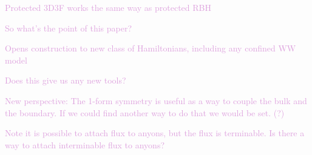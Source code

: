 \documentclass[twocolumn, longbibliography]{revtex4-2}
\newcommand{\outline}[1]{\textcolor{Plum}{#1}}
\begin{document}
\outline{Protected 3D3F works the same way as protected RBH}
	
\outline{So what's the point of this paper?}
	
\outline{Opens construction to new class of Hamiltonians, including any confined WW model}
	
\outline{Does this give us any new tools?}
	
\outline{New perspective: The 1-form symmetry is useful as a way to couple the bulk and the boundary. If we could find another way to do that we would be set. (?)}
	
\outline{Note it is possible to attach flux to anyons, but the flux is terminable. Is there a way to attach interminable flux to anyons?}
	

	
\end{document}
